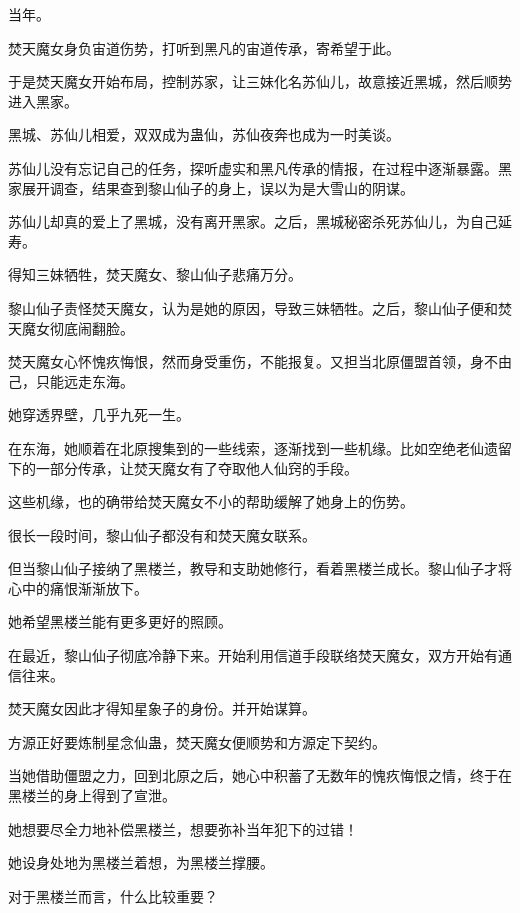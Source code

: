
\begin{this_body}

当年。

焚天魔女身负宙道伤势，打听到黑凡的宙道传承，寄希望于此。

于是焚天魔女开始布局，控制苏家，让三妹化名苏仙儿，故意接近黑城，然后顺势进入黑家。

黑城、苏仙儿相爱，双双成为蛊仙，苏仙夜奔也成为一时美谈。

苏仙儿没有忘记自己的任务，探听虚实和黑凡传承的情报，在过程中逐渐暴露。黑家展开调查，结果查到黎山仙子的身上，误以为是大雪山的阴谋。

苏仙儿却真的爱上了黑城，没有离开黑家。之后，黑城秘密杀死苏仙儿，为自己延寿。

得知三妹牺牲，焚天魔女、黎山仙子悲痛万分。

黎山仙子责怪焚天魔女，认为是她的原因，导致三妹牺牲。之后，黎山仙子便和焚天魔女彻底闹翻脸。

焚天魔女心怀愧疚悔恨，然而身受重伤，不能报复。又担当北原僵盟首领，身不由己，只能远走东海。

她穿透界壁，几乎九死一生。

在东海，她顺着在北原搜集到的一些线索，逐渐找到一些机缘。比如空绝老仙遗留下的一部分传承，让焚天魔女有了夺取他人仙窍的手段。

这些机缘，也的确带给焚天魔女不小的帮助缓解了她身上的伤势。

很长一段时间，黎山仙子都没有和焚天魔女联系。

但当黎山仙子接纳了黑楼兰，教导和支助她修行，看着黑楼兰成长。黎山仙子才将心中的痛恨渐渐放下。

她希望黑楼兰能有更多更好的照顾。

在最近，黎山仙子彻底冷静下来。开始利用信道手段联络焚天魔女，双方开始有通信往来。

焚天魔女因此才得知星象子的身份。并开始谋算。

方源正好要炼制星念仙蛊，焚天魔女便顺势和方源定下契约。

当她借助僵盟之力，回到北原之后，她心中积蓄了无数年的愧疚悔恨之情，终于在黑楼兰的身上得到了宣泄。

她想要尽全力地补偿黑楼兰，想要弥补当年犯下的过错！

她设身处地为黑楼兰着想，为黑楼兰撑腰。

对于黑楼兰而言，什么比较重要？


\end{this_body}
